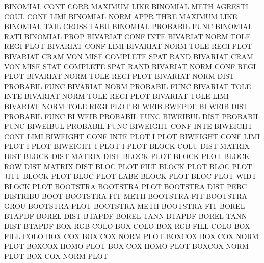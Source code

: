 BINOMIAL CONT CORR                      MAXIMUM  LIKE
BINOMIAL METH                           AGRESTI  COUL CONF LIMI
BINOMIAL NORM APPR THRE                 MAXIMUM  LIKE
BINOMIAL TAIL                           CROSS    TABU
BINOMIAL                                PROBABIL FUNC
BINOMIAL RATI                           BINOMIAL PROP
BIVARIAT CONF INTE                      BIVARIAT NORM TOLE REGI PLOT
BIVARIAT CONF LIMI                      BIVARIAT NORM TOLE REGI PLOT
BIVARIAT CRAM VON  MISE                 COMPLETE SPAT RAND
BIVARIAT CRAM VON  MISE STAT            COMPLETE SPAT RAND
BIVARIAT NORM CONF REGI PLOT            BIVARIAT NORM TOLE REGI PLOT
BIVARIAT NORM DIST                      PROBABIL FUNC
BIVARIAT NORM                           PROBABIL FUNC
BIVARIAT TOLE INTE                      BIVARIAT NORM TOLE REGI PLOT
BIVARIAT TOLE LIMI                      BIVARIAT NORM TOLE REGI PLOT
BI       WEIB                           BWEPDF
BI       WEIB DIST                      PROBABIL FUNC
BI       WEIB                           PROBABIL FUNC
BIWEIBUL DIST                           PROBABIL FUNC
BIWEIBUL                                PROBABIL FUNC
BIWEIGHT CONF INTE                      BIWEIGHT CONF LIMI
BIWEIGHT CONF INTE PLOT                 I        PLOT
BIWEIGHT CONF LIMI PLOT                 I        PLOT
BIWEIGHT I    PLOT                      I        PLOT
BLOCK    COLU DIST                      MATRIX   DIST
BLOCK    DIST                           MATRIX   DIST
BLOCK    PLOT                           BLOCK    PLOT
BLOCK    ROW  DIST                      MATRIX   DIST
BLOC     PLOT FILT                      BLOCK    PLOT
BLOC     PLOT JITT                      BLOCK    PLOT
BLOC     PLOT LABE                      BLOCK    PLOT
BLOC     PLOT WIDT                      BLOCK    PLOT
BOOTSTRA                                BOOTSTRA PLOT
BOOTSTRA DIST PERC                      DISTRIBU BOOT
BOOTSTRA FIT  METH                      BOOTSTRA FIT
BOOTSTRA GROU                           BOOTSTRA PLOT
BOOTSTRA METH                           BOOTSTRA FIT
BOREL                                   BTAPDF
BOREL    DIST                           BTAPDF
BOREL    TANN                           BTAPDF
BOREL    TANN DIST                      BTAPDF
BOX      RGB  COLO                      BOX      COLO
BOX      RGB  FILL COLO                 BOX      FILL COLO
BOX      COX                            BOX      COX  NORM PLOT
BOXCOX                                  BOX      COX  NORM PLOT
BOXCOX   HOMO PLOT                      BOX      COX  HOMO PLOT
BOXCOX   NORM PLOT                      BOX      COX  NORM PLOT
